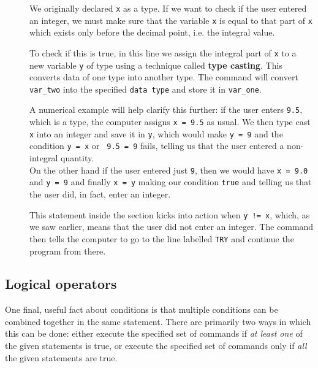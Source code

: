 \documentclass[11pt,oneside]{article}
\begin{document}
{{{{{{{{{\begin{description}
\item[] We originally declared \verb+x+ as a  type. If we want to check if the user entered an integer, we must make sure that the  variable \verb+x+ is equal to that part of \verb+x+ which exists only before the decimal point, i.e. the integral value.

To check if this is true, in this line we assign the integral part of \verb+x+ to a new variable \verb+y+ of type  using a technique called \textbf{type casting}. This converts data of one type into another type. The command  will convert \verb+var_two+ into the specified \verb+data type+ and store it in \verb+var_one+.

A numerical example will help clarify this further: if the user enters \verb+9.5+, which is a  type, the computer assigns \verb+x = 9.5+ as usual. We then type cast \verb+x+ into an integer and save it in \verb+y+, which would make \verb+y = 9+ and the condition \verb+y = x+ or \verb+ 9.5 = 9+ fails, telling us that the user entered a non-integral quantity.\\

On the other hand if the user entered just \verb+9+, then we would have \verb+x = 9.0+ and \verb+y = 9+ and finally \verb+x = y+ making our condition \verb+true+ and telling us that the user did, in fact, enter an integer.

\item[] This  statement inside the  section kicks into action when \verb+y != x+, which, as we saw earlier, means that the user did not enter an integer. The  command then tells the computer to go to the line labelled \verb+TRY+ and continue the program from there.
\end{description}

\subsection{Logical operators}

One final, useful fact about  conditions is that multiple conditions can be combined together in the same statement. There are primarily two ways in which this can be done: either execute the specified set of commands if \textit{at least one} of the given statements is true, or execute the specified set of commands only if \textit{all} the given statements are true.

}}}}}}}}}
\end{document}
